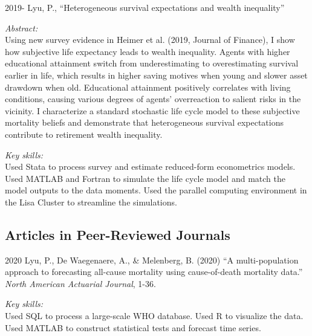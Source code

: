 \documentclass[12pt,letterpaper]{report}
\begin{document}
	\begin{tablist}
	
	\item[2019-] \tab  Lyu, P., \enquote{Heterogeneous survival expectations and wealth inequality}

	\medskip
	
	\textit{Abstract:}\\
	
	Using new survey evidence in Heimer et al. (2019, Journal of Finance), I show how subjective life expectancy leads to wealth inequality. Agents with higher educational attainment switch from underestimating to overestimating survival earlier in life, which results in higher saving motives when young and slower asset drawdown when old. Educational attainment positively correlates with living conditions, causing various degrees of agents' overreaction to salient risks in the vicinity. I characterize a standard stochastic life cycle model to these subjective mortality beliefs and demonstrate that heterogeneous survival expectations contribute to retirement wealth inequality. 
	
	
	\medskip
	
	\textit{Key skills:}\\
	Used Stata to process survey and estimate reduced-form econometrics models. Used MATLAB and Fortran to simulate the life cycle model and match the model outputs to the data moments. Used the parallel computing environment in the Lisa Cluster to streamline the simulations.

	
	\end{tablist}

    \subsection*{Articles in Peer-Reviewed Journals}

    \begin{tablist}
    	\item[2020] \tab Lyu, P., De Waegenaere, A., \& Melenberg, B. (2020) \enquote{A multi-population approach to forecasting all-cause mortality using cause-of-death mortality data.} \textit{North American Actuarial Journal}, 1-36. %
    	\medskip
    	
    	\textit{Key skills:}\\
		Used SQL to process a large-scale WHO database. Used R to visualize the data. Used MATLAB to construct statistical tests and forecast time series.



    \end{tablist}
\end{document}

